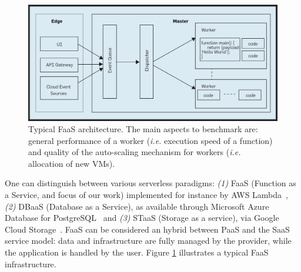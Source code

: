 \begin{figure}[!t]
\begin{center}
\includegraphics[scale=0.2]{bilder/FaaS_architecture.png}
\captionsetup[table]{justification=centering, labelfont=bf}
\caption{Typical FaaS architecture. The main aspects to benchmark are: general performance of a worker (\emph{i.e.} execution speed of a function) and quality of the auto-scaling mechanism for workers (\emph{i.e.} allocation of new VMs).\label{fig:faas_arch}}
\end{center}
\end{figure}
One can distinguish between various serverless paradigms: \emph{(1)} FaaS (Function as a Service, and focus of our work) implemented for instance by \gls{AWS} Lambda~\cite{AWSLambda}, \emph{(2)} DBaaS (Database as a Service), as available through Microsoft Azure Database for PostgreSQL~\cite{AzureDBaaS} and \emph{(3)} STaaS (Storage as a service), via Google Cloud Storage~\cite{serverlessgoogle}. 
FaaS can be considered an hybrid between \gls{PaaS} and the \gls{SaaS} service model: data and infrastructure are fully managed by the provider, while the application is handled by the user.
Figure \ref{fig:faas_arch} illustrates a typical FaaS infrastructure.
